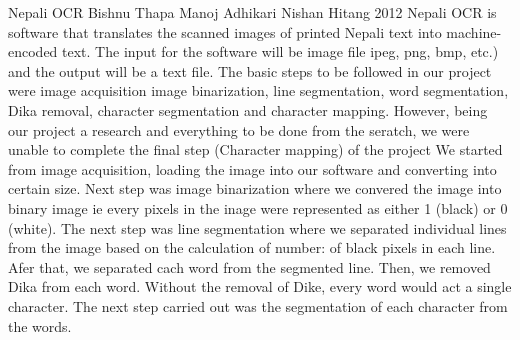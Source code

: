  \begin{conf-abstract}[]
{Nepali OCR}
{
	Bishnu Thapa
	Manoj Adhikari
	Nishan Hitang
}
{2012}
Nepali OCR is software that translates the scanned images of printed
Nepali text into machine-encoded text. The input for the software will be
image file ipeg, png, bmp, etc.) and the output will be a text file.
The basic steps to be followed in our project were image acquisition
image binarization, line segmentation, word segmentation, Dika removal,
character segmentation and character mapping. However, being our
project a research and everything to be done from the seratch, we were
unable to complete the final step (Character mapping) of the project
We started from image acquisition, loading the image into our software
and converting into certain size. Next step was image binarization where
we convered the image into binary image ie every pixels in the inage
were represented as either 1 (black) or 0 (white). The next step was line
segmentation where we separated individual lines from the image based
on the calculation of number: of black pixels in each line. Afer that, we
separated cach word from the segmented line. Then, we removed Dika
from each word. Without the removal of Dike, every word would act a
single character. The next step carried out was the segmentation of each
character from the words.
  \end{conf-abstract}